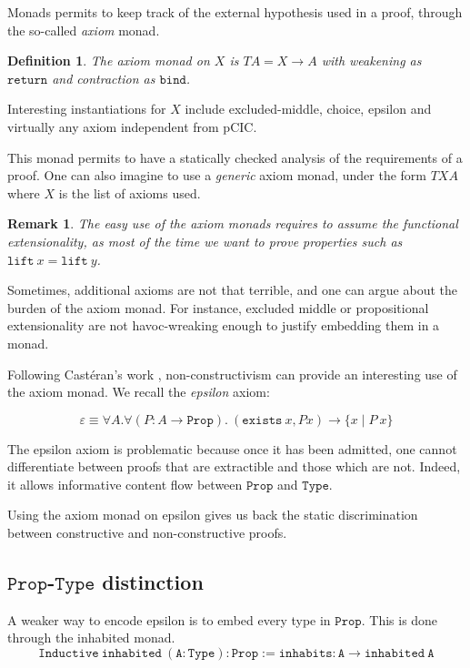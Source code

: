 \documentclass[a4paper,11pt]{article}
\newtheorem{definition}{Definition}
\newtheorem{remark}{Remark}
\theoremstyle{definition}
\theoremstyle{remark}
\begin{document}
  Monads permits to keep track of the external hypothesis used in a proof, through the so-called \emph{axiom} monad.

  \begin{definition}
    The axiom monad on $X$ is $T A = X \rightarrow A$ with weakening as $\mathtt{return}$ and contraction as $\mathtt{bind}$.
  \end{definition}

  Interesting instantiations for $X$ include excluded-middle, choice, epsilon and virtually any axiom independent from pCIC.

  This monad permits to have a statically checked analysis of the requirements of a proof. One can also imagine to use a \emph{generic} axiom monad, under the form $T X A$ where $X$ is the list of axioms used.

  \begin{remark}
    The easy use of the axiom monads requires to assume the functional extensionality, as most of the time we want to prove properties such as $\mathtt{lift}\ x = \mathtt{lift}\ y$.
  \end{remark} %

  Sometimes, additional axioms are not that terrible, and one can argue about the burden of the axiom monad. For instance, excluded middle or propositional extensionality are not havoc-wreaking enough to justify embedding them in a monad.

  Following Castéran's work \cite{casteranepsilon}, non-constructivism can provide an interesting use of the axiom monad. We recall the \emph{epsilon} axiom:

$$\varepsilon ≡ \forall A.\forall (P : A\rightarrow  \mathtt{Prop}).\ (\mathtt{exists}\ x, P x) \rightarrow \{x\mid P\  x\}$$

  The epsilon axiom is problematic because once it has been admitted, one cannot differentiate between proofs that are extractible and those which are not. Indeed, it allows informative content flow between $\mathtt{Prop}$ and $\mathtt{Type}$.

  Using the axiom monad on epsilon gives us back the static discrimination between constructive and non-constructive proofs.

\subsection{$\mathtt{Prop}$-$\mathtt{Type}$ distinction}

  A weaker way to encode epsilon is to embed every type in $\mathtt{Prop}$. This is done through the inhabited monad.
  $$\mathtt{Inductive\ inhabited\ (A : Type) : Prop :=  inhabits : A \rightarrow inhabited\ A}$$
\end{document}
